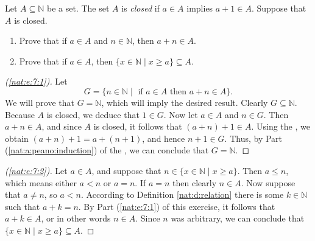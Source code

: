 \Newpage
\begin{exercise} %
	Let $A \subseteq \mathbb{N}$ be a set. The set $A$ is \emph{closed} if $a \in A$ implies $a + 1 \in A$. Suppose that $A$ is closed.
	\begin{enumerate}
		\item \label{nat:e:7:1}
		      Prove that if $a \in A$ and $n \in \mathbb{N}$, then $a +n  \in A$.
		\item \label{nat:e:7:2}
		      Prove that if $a \in A$, then $\{x \in \mathbb{N} \mid x \geq a\} \subseteq A$.
	\end{enumerate}
\end{exercise}

\begin{proof}[(\ref{nat:e:7:1})]
	Let
	\[
		G = \{ n \in \mathbb{N} \mid \text{ if } a \in A \text{ then } a + n \in A \}.
	\]
	We will prove that $G = \mathbb{N}$, which will imply the desired result. Clearly $G \subseteq \mathbb{N}$. Because $A$ is closed, we deduce that $1 \in G$. Now let $a \in A$ and $n \in G$. Then $a + n \in A$, and since $A$ is closed, it follows that $(a + n) + 1 \in A$. Using the , we obtain $(a + n) + 1 = a + (n + 1)$, and hence $n + 1 \in G$. Thus, by Part (\ref{nat:a:peano:induction}) of the , we can conclude that $G = \mathbb{N}$.
\end{proof}

\begin{proof}[(\ref{nat:e:7:2})]
	Let $a \in A$, and suppose that $n \in \{ x \in \mathbb{N} \mid x \geq a \}$. Then $a \leq n$, which means either $a < n$ or $a = n$. If $a = n$ then clearly $n \in A$. Now suppose that $a \not= n$, so $a < n$. According to Definition \ref{nat:d:relation} there is some $k \in \mathbb{N}$ such that $a + k = n$. By Part (\ref{nat:e:7:1}) of this exercise, it follows that $a + k \in A$, or in other words $n \in A$. Since $n$ was arbitrary, we can conclude that $\{ x \in \mathbb{N} \mid x \geq a \} \subseteq A$.
\end{proof}


